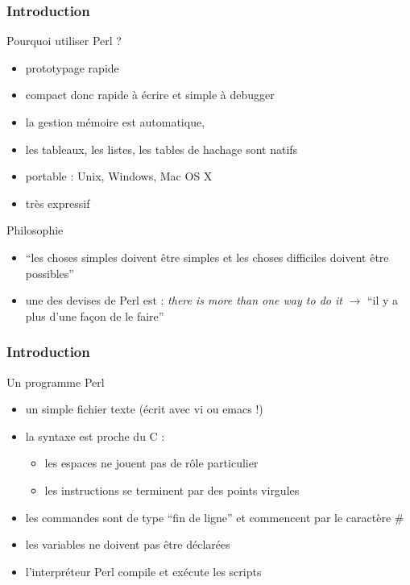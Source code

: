 \begin{frame}
  \frametitle{Introduction}

  \begin{block}{Pourquoi utiliser Perl ?}
    \begin{itemize}
      \item prototypage rapide
      \item compact donc rapide à écrire et simple à debugger
      \item la gestion mémoire est automatique,
      \item les tableaux, les listes, les tables de hachage sont natifs
      \item portable : Unix, Windows, Mac OS X
      \item très expressif
    \end{itemize}
  \end{block}

  \begin{exampleblock}{Philosophie}
    \begin{itemize}
      \item ``les choses simples doivent être simples et les choses difficiles
        doivent être possibles''
      \item une des devises de Perl est : \textit{there is more than one way
        to do it} $\rightarrow$ ``il y a plus d'une façon de le faire''
    \end{itemize}
  \end{exampleblock}

\end{frame}

\begin{frame}[fragile]
  \frametitle{Introduction}

  \begin{block}{Un programme Perl}
    \begin{itemize}
      \item un simple fichier texte (écrit avec vi ou emacs !)
      \item la syntaxe est proche du C :
        \begin{itemize}
        \item les espaces ne jouent pas de rôle particulier
        \item les instructions se terminent par des points virgules
        \end{itemize}
      \item les commandes sont de type ``fin de ligne'' et commencent
        par le caractère \#
      \item les variables ne doivent pas être déclarées
      \item l'interpréteur Perl compile et exécute les scripts
    \end{itemize}
  \end{block}

\end{frame}

